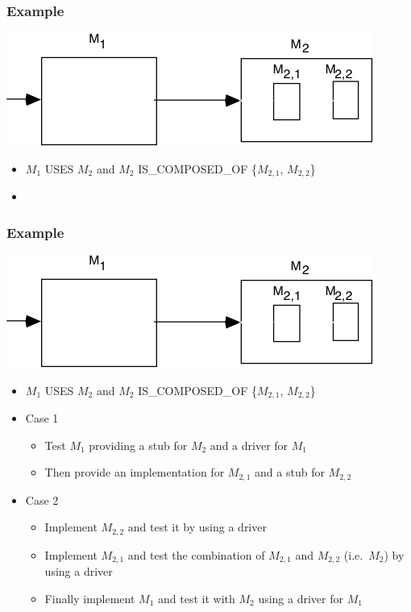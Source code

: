 \documentclass[t,12pt,numbers,fleqn]{beamer}
\begin{document}

\begin{frame}
\frametitle{Example \cite{GhezziEtAl2003}}

\begin{center}
\includegraphics[scale=0.35]{../Figures/Example.png}
\end{center}

\begin{itemize}
\item $M_1$ USES $M_2$ and $M_2$ IS\_COMPOSED\_OF \{$M_{2,1}$, $M_{2,2}$\}
\item {}
\end{itemize}
\end{frame}


\begin{frame}
\frametitle{Example \cite{GhezziEtAl2003}}

\begin{center}
\includegraphics[scale=0.35]{../Figures/Example.png}
\end{center}

\begin{itemize}
\item $M_1$ USES $M_2$ and $M_2$ IS\_COMPOSED\_OF \{$M_{2,1}$, $M_{2,2}$\}
\item Case 1
\begin{itemize}
\item Test $M_1$ providing a stub for $M_2$ and a driver for $M_1$
\item Then provide an implementation for $M_{2,1}$ and a stub for $M_{2,2}$
\end{itemize}
\item Case 2
\begin{itemize}
\item Implement $M_{2,2}$ and test it by using a driver
\item Implement $M_{2,1}$ and test the combination of $M_{2,1}$ and $M_{2,2}$
  (i.e.\ $M_2$) by using a driver
\item Finally implement $M_1$ and test it with $M_2$ using a driver for $M_1$
\end{itemize}
\end{itemize}
\end{frame}
\end{document}

